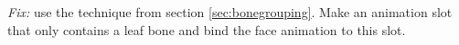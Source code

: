 \documentclass{uva-inf-article}
\begin{document}
\textit{Fix:} use the technique from section \ref{sec:bonegrouping}. Make an animation slot that only contains a leaf bone and bind the face animation to this slot.


\printbibliography



\end{document}
